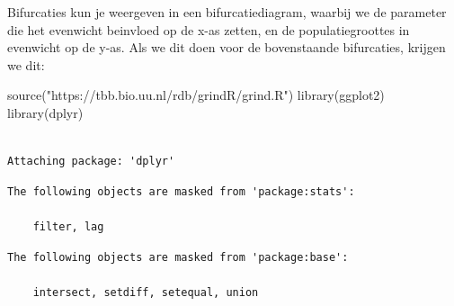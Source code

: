 \documentclass[
  a4paper,
]{scrbook}
\newenvironment{Shaded}{\begin{snugshade}}{\end{snugshade}}
\newcommand{\FunctionTok}[1]{\textcolor[rgb]{0.28,0.35,0.67}{#1}}
\newcommand{\NormalTok}[1]{\textcolor[rgb]{0.00,0.23,0.31}{#1}}
\newcommand{\StringTok}[1]{\textcolor[rgb]{0.13,0.47,0.30}{#1}}
\theoremstyle{definition}
\theoremstyle{remark}
\begin{document}
Bifurcaties kun je weergeven in een bifurcatiediagram, waarbij we de
parameter die het evenwicht beinvloed op de x-as zetten, en de
populatiegroottes in evenwicht op de y-as. Als we dit doen voor de
bovenstaande bifurcaties, krijgen we dit:

\begin{Shaded}
\begin{Highlighting}[]
\FunctionTok{source}\NormalTok{(}\StringTok{"https://tbb.bio.uu.nl/rdb/grindR/grind.R"}\NormalTok{)}
\FunctionTok{library}\NormalTok{(ggplot2)}
\FunctionTok{library}\NormalTok{(dplyr)}
\end{Highlighting}
\end{Shaded}

\begin{verbatim}

Attaching package: 'dplyr'
\end{verbatim}

\begin{verbatim}
The following objects are masked from 'package:stats':

    filter, lag
\end{verbatim}

\begin{verbatim}
The following objects are masked from 'package:base':

    intersect, setdiff, setequal, union
\end{verbatim}
\end{document}
